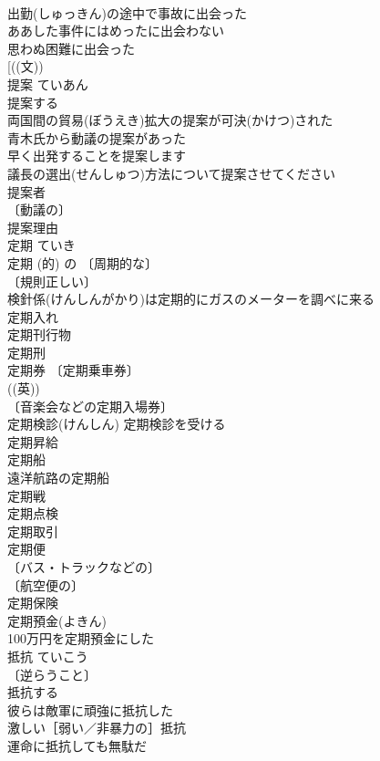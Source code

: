 \documentclass[8pt]{extreport}
\begin{document}
\begin{CJK}{UTF8}{min}
\\	出勤(しゅっきん)の途中で事故に出会った 
\\	ああした事件にはめったに出会わない 
\\	思わぬ困難に出会った 
\\	[((文))
\\	提案	ていあん	
\\	提案する 
\\	両国間の貿易(ぼうえき)拡大の提案が可決(かけつ)された 
\\	青木氏から動議の提案があった 
\\	早く出発することを提案します 
\\	議長の選出(せんしゅつ)方法について提案させてください 
\\	提案者 
\\	〔動議の〕
\\	提案理由 
\\	定期	ていき	
\\	定期 (的) の 〔周期的な〕
\\	〔規則正しい〕
\\	検針係(けんしんがかり)は定期的にガスのメーターを調べに来る 
\\	定期入れ 
\\	定期刊行物 
\\	定期刑 
\\	定期券 〔定期乗車券〕
\\	((英)) 
\\	〔音楽会などの定期入場券〕
\\	定期検診(けんしん) 定期検診を受ける 
\\	定期昇給 
\\	定期船 
\\	遠洋航路の定期船 
\\	定期戦 
\\	定期点検 
\\	定期取引 
\\	定期便 
\\	〔バス・トラックなどの〕
\\	〔航空便の〕
\\	定期保険 
\\	定期預金(よきん) 
\\	100万円を定期預金にした 
\\	抵抗	ていこう	
\\	〔逆らうこと〕
\\	抵抗する 
\\	彼らは敵軍に頑強に抵抗した 
\\	激しい［弱い／非暴力の］抵抗 
\\	運命に抵抗しても無駄だ 

\end{CJK}
\end{document}
